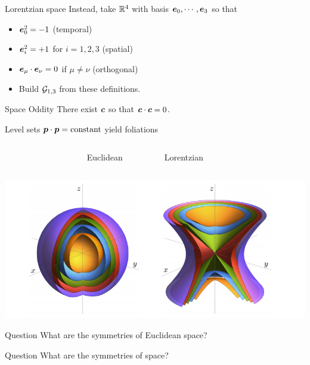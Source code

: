 \documentclass[UKenglish]{beamer}
\begin{document}
\begin{frame}{Lorentzian space}
\vfill
Instead, take $\mathbb{R}^4$ with basis $\boldsymbol{e}_0,\cdots,\boldsymbol{e}_3$ so that
\begin{itemize}
	\item $\boldsymbol{e}_0^2 = -1$ (temporal)
	\item $\boldsymbol{e}_i^2 = +1$ for $i=1,2,3$ (spatial)
	\item $\boldsymbol{e}_\mu \cdot \boldsymbol{e}_\nu = 0$ if $\mu \neq \nu$ (orthogonal)
	\item Build $\mathcal{G}_{1,3}$ from these definitions.
\end{itemize}
\vfill
\end{frame}

\begin{frame}{Space Oddity}
\vfill
\center
There exist  $\boldsymbol{c}$ so that $\boldsymbol{c}\cdot \boldsymbol{c} = 0$.
\vfill
\end{frame}

\begin{frame}{}
\vfill
\centering Level sets $\boldsymbol{p}\cdot \boldsymbol{p} = \textrm{constant}$ yield foliations
\vspace*{.5cm}
\begin{columns}[c]
~~~~~~~~~~~~~~~~~~~ Euclidean 

~~~~~~~Lorentzian
\end{columns}
\begin{center}
    \includegraphics[scale=.5]{figures/foliations2.png}
\end{center}
\vfill   
\end{frame}

\begin{frame}{Question}
    \vfill
    \center
    What are the symmetries of Euclidean space?
    \vfill
\end{frame}

\begin{frame}{Question}
    \vfill
    \center
    What are the symmetries of  space?
    \vfill
\end{frame}
\end{document}
